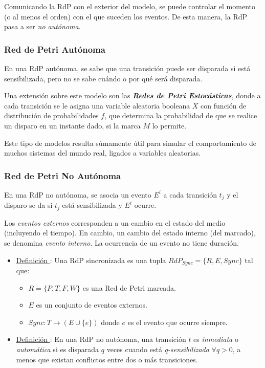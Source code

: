 Comunicando la RdP con el exterior del modelo, se puede controlar el momento (o
al menos el orden) con el que suceden los eventos. De esta manera, la RdP pasa a
ser \textit{no autónoma}.

\subsubsection{Red de Petri Autónoma}

En una RdP autónoma, se sabe que una transición puede ser disparada si está
sensibilizada, pero no se sabe cuándo o por qué será disparada.

Una extensión sobre este modelo son las \textit{\textbf{Redes de Petri
Estocásticas}}, donde a cada transición se le asigna una variable aleatoria
booleana $X$ con función de distribución de probabilidades $f$, que determina la
probabilidad de que se realice un disparo en un instante dado, si la marca $M$ lo permite.

Este tipo de modelos resulta súmamente útil para simular el comportamiento de
muchos sistemas del mundo real, ligados a variables aleatorias.

\subsubsection{Red de Petri No Autónoma}
En una RdP no autónoma, se asocia un evento $E^{i}$ a cada transición $t_{j}$ y
el disparo se da si $t_{j}$ está sensibilizada y $E^{i}$ ocurre.

Los \textit{eventos externos} corresponden a un cambio en el estado del medio
(incluyendo el tiempo). En cambio, un cambio del estado interno (del marcado),
se denomina \textit{evento interno}. La ocurrencia de un evento no tiene
duración. \cite{Hybrid_petri_nets}

\begin{itemize}
  \item \underline{Definición \thedefinitionsCounter}: Una RdP sincronizada es una tupla
  $RdP_{Sync} = \{R, E, Sync\}$ tal que:
  \begin{itemize}
    \item $R =  \{P,T,F,W\}$ es una Red de Petri marcada.
    \item $E$ es un conjunto de eventos externos.
    \item $Sync : T \rightarrow (E \cup \{e\} ) $ donde $e$ es el evento
    que ocurre siempre.
  \end{itemize}
  \item \underline{Definición \thedefinitionsCounter}: En una RdP no autónoma, una transición $t$
   es \textit{inmediata} o \textit{automática} si es disparada $q$ veces cuando
   está \textit{q-sensibilizada} $\forall q > 0$, a menos que existan conflictos
   entre dos o más transiciones.
\end{itemize}

